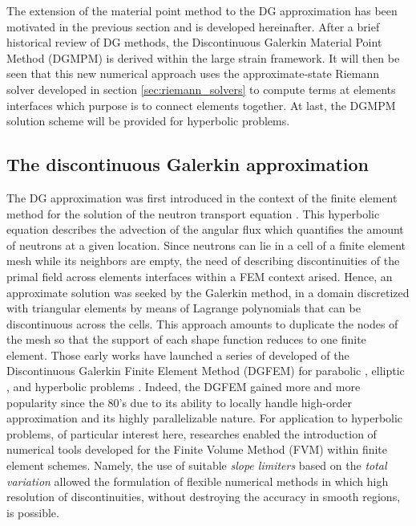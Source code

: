 The extension of the material point method to the DG approximation has been motivated in the previous section and is developed hereinafter. After a brief historical review of DG methods, the Discontinuous Galerkin Material Point Method (DGMPM) is derived within the large strain framework. It will then be seen that this new numerical approach uses the approximate-state Riemann solver developed in section \ref{sec:riemann_solvers} to compute terms at elements interfaces which purpose is to connect elements together. At last, the DGMPM solution scheme will be provided for hyperbolic problems.

\subsection{The discontinuous Galerkin approximation}
The DG approximation was first introduced in the context of the finite element method for the solution of the neutron transport equation \cite{NeutronDG}. This hyperbolic equation describes the advection of the angular flux which quantifies the amount of neutrons at a given location. Since neutrons can lie in a cell of a finite element mesh while its neighbors are empty, the need of describing discontinuities of the primal field across elements interfaces within a FEM context arised. Hence, an approximate solution was seeked by the Galerkin method, in a domain discretized with triangular elements by means of Lagrange polynomials that can be discontinuous across the cells. This approach amounts to duplicate the nodes of the mesh so that the support of each shape function reduces to one finite element. Those early works have launched a series of developed of the Discontinuous Galerkin Finite Element Method (DGFEM) for parabolic \cite{Arnold_IPM}, elliptic \cite{Hansbo_DGsolid,Noel_HEDG}, and hyperbolic problems \cite{Cockburn}. Indeed, the DGFEM gained more and more popularity since the 80's due to its ability to locally handle high-order approximation and its highly parallelizable nature. 
For application to hyperbolic problems, of particular interest here, researches enabled the introduction of numerical tools developed for the Finite Volume Method (FVM) within finite element schemes. Namely, the use of suitable \textit{slope limiters} based on the \textit{total variation} \cite{vanLeer_Limiters} allowed the formulation of flexible numerical methods in which high resolution of discontinuities, without destroying the accuracy in smooth regions, is possible.

